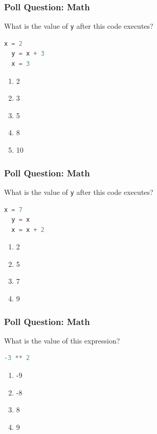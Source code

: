 \documentclass{beamer}
\begin{document}
%
%
%
\begin{frame}[fragile]
  \frametitle{Poll Question: Math}
  \vfill
  What is the value of \lstinline|y| after this code executes?
  \begin{lstlisting}[language=Python, autogobble]
  x = 2
  y = x + 3
  x = 3
  \end{lstlisting}
  \vfill
  \begin{enumerate}[A]
    \item 2 
    \item 3
    \item 5
    \item 8
    \item 10
  \end{enumerate}
\end{frame}


%
%
%
\begin{frame}[fragile]
  \frametitle{Poll Question: Math}
  \vfill
  What is the value of \lstinline|y| after this code executes?
  \begin{lstlisting}[language=Python, autogobble]
  x = 7
  y = x
  x = x + 2
  \end{lstlisting}
  \vfill
  \begin{enumerate}
    \item 2
    \item 5 
    \item 7
    \item 9
  \end{enumerate}
\end{frame}

%
%
\begin{frame}[fragile]
  \frametitle{Poll Question: Math}
  \vfill
  What is the value of this expression?
  \begin{lstlisting}[language=Python, autogobble]
  -3 ** 2
  \end{lstlisting}
  \vfill
  \begin{enumerate}[A]
    \item -9
    \item -8
    \item 8
    \item 9
  \end{enumerate}
\end{frame}
\end{document}
